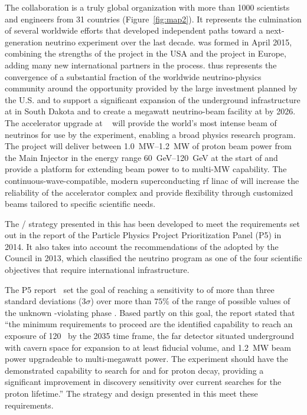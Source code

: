 The  collaboration is a truly global organization with more than \num{1000} scientists and engineers from \num{31} countries (Figure~\ref{fig:map2}). It represents the culmination of several worldwide efforts that developed independent paths toward a next-generation  neutrino experiment over the last decade.  was formed in April 2015, combining the strengths of the  project in the USA and the  project in Europe, adding many new international partners in the process.  thus represents the convergence of a substantial fraction of the worldwide neutrino-physics community around the opportunity provided by the large investment planned by the U.S.  and  to support a significant expansion of the underground infrastructure at  in South Dakota and to create a megawatt neutrino-beam facility at  by 2026. 
The  accelerator upgrade at ~\cite{pip2-2013} will provide the world's most intense beam of neutrinos for use by the %
 experiment, enabling a broad physics research program.  
The  project will deliver between \SIrange{1.0}{1.2}{\MW} of proton beam power from the  Main Injector in the energy range \SIrange{60}{120}{\GeV} at the start of  and provide a platform for extending beam power to  to multi-MW capability. %
The continuous-wave-compatible, modern superconducting rf linac of  will increase the reliability of the  accelerator complex and provide flexibility through customized  beams tailored to specific scientific needs.  

The / strategy presented in this  has been developed to meet the requirements set out in the report of the Particle Physics Project Prioritization Panel (P5) in 2014. It also takes into account the recommendations of the  adopted by the  Council in 2013, which classified the  neutrino program as one of the four scientific objectives that require international infrastructure.

The P5 report~\cite{p5report} set the goal of reaching a sensitivity to  of more than three standard deviations (\num{3}$\sigma$) over more than $75\%$ 
of the range of possible values of the unknown -violating phase \deltacp.
Based partly on this goal, the report stated that ``the 
minimum requirements to proceed are the identified capability to reach an exposure 
of \num{120}~\ktMWyr{} by the 2035 time frame, the far detector situated underground 
with cavern space for expansion to at least \fdfiducialmass {} fiducial volume, and \SI{1.2}{MW} 
beam power upgradeable to multi-megawatt power.
The experiment should have the demonstrated 
capability to search for  and for proton decay, providing a significant 
improvement in discovery sensitivity over current searches for the proton lifetime.'' The strategy and design presented in this  meet these requirements.

